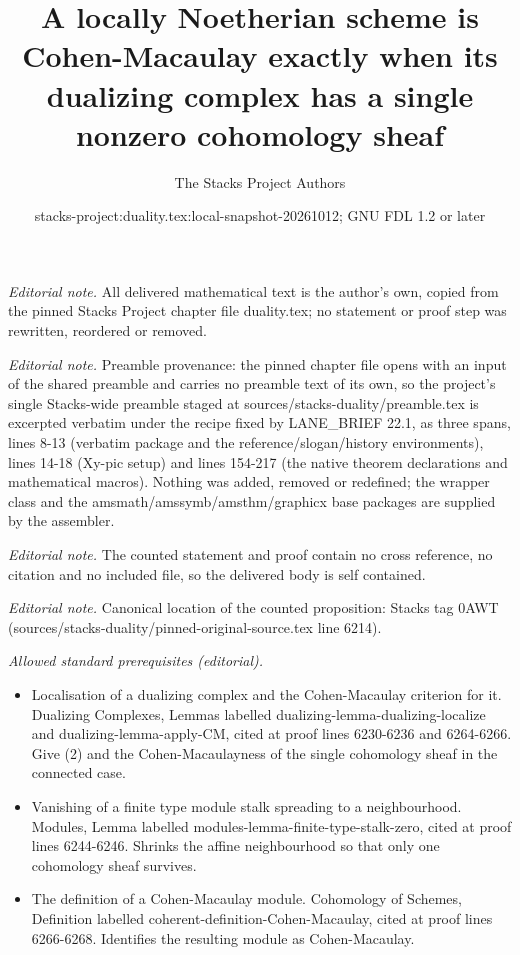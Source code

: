 \documentclass[10pt,a4paper]{amsart}
\title{A locally Noetherian scheme is Cohen-Macaulay exactly when its dualizing complex has a single nonzero cohomology sheaf}
\author{The Stacks Project Authors}
\date{stacks-project:duality.tex:local-snapshot-20261012; GNU FDL 1.2 or later}
\theoremstyle{plain}
\theoremstyle{definition}
\theoremstyle{remark}
\numberwithin{equation}{subsection}
\begin{document}
\maketitle
\noindent\textit{Editorial note.} All delivered mathematical text is the author's own, copied from the pinned Stacks Project chapter file duality.tex; no statement or proof step was rewritten, reordered or removed.\par\medskip
\noindent\textit{Editorial note.} Preamble provenance: the pinned chapter file opens with an input of the shared preamble and carries no preamble text of its own, so the project's single Stacks-wide preamble staged at sources/stacks-duality/preamble.tex is excerpted verbatim under the recipe fixed by LANE\_BRIEF 22.1, as three spans, lines 8-13 (verbatim package and the reference/slogan/history environments), lines 14-18 (Xy-pic setup) and lines 154-217 (the native theorem declarations and mathematical macros). Nothing was added, removed or redefined; the wrapper class and the amsmath/amssymb/amsthm/graphicx base packages are supplied by the assembler.\par\medskip
\noindent\textit{Editorial note.} The counted statement and proof contain no cross reference, no citation and no included file, so the delivered body is self contained.\par\medskip
\noindent\textit{Editorial note.} Canonical location of the counted proposition: Stacks tag 0AWT (sources/stacks-duality/pinned-original-source.tex line 6214).\par\medskip
\noindent\textit{Allowed standard prerequisites (editorial).}\begin{itemize}
\item Localisation of a dualizing complex and the Cohen-Macaulay criterion for it. Dualizing Complexes, Lemmas labelled dualizing-lemma-dualizing-localize and dualizing-lemma-apply-CM, cited at proof lines 6230-6236 and 6264-6266. Give (2) and the Cohen-Macaulayness of the single cohomology sheaf in the connected case.
\item Vanishing of a finite type module stalk spreading to a neighbourhood. Modules, Lemma labelled modules-lemma-finite-type-stalk-zero, cited at proof lines 6244-6246. Shrinks the affine neighbourhood so that only one cohomology sheaf survives.
\item The definition of a Cohen-Macaulay module. Cohomology of Schemes, Definition labelled coherent-definition-Cohen-Macaulay, cited at proof lines 6266-6268. Identifies the resulting module as Cohen-Macaulay.
\end{itemize}\medskip
\end{document}
